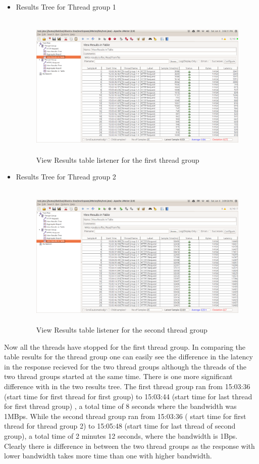\documentclass[12pt]{book}
\begin{document}
  \begin{itemize}
   \item Results Tree for Thread group 1
	 \begin{figure}[H]
	   \centering
	   \includegraphics[width=15cm, height=7cm]{images/bt_4}
	   \caption{View Results table listener for the first thread group\label{fig:fig54_JMeter}}
	 \end{figure}
  
   \item Results Tree for Thread group 2
	 \begin{figure}[H]
	   \centering
	   \includegraphics[width=15cm, height=7cm]{images/bt_5}
	   \caption{View Results table listener for the second thread group\label{fig:fig55_JMeter}}
	 \end{figure}
  \end{itemize}
  
  Now all the threads have stopped for the first thread group. In comparing the table results for the
  thread group one can easily see the difference in the latency in the response recieved for the two
  thread groups although the threads of the two thread groups started at the same time. There is one
  more significant difference with in the two results tree. The first thread group ran from 15:03:36
  (start time for first thread for first group) to 15:03:44 (start time for last thread for first thread
  group) , a total time of 8 seconds where the bandwidth was 1MBps. While the second thread
  group ran from 15:03:36 ( start time for first thread for thread group 2) to 15:05:48 (start time for
  last thread of second group), a total time of 2 minutes 12 seconds, where the bandwidth is 1Bps.\\
  Clearly there is difference in between the two thread groups as the response with lower bandwidth
  takes more time than one with higher bandwidth.
  
\end{document}
